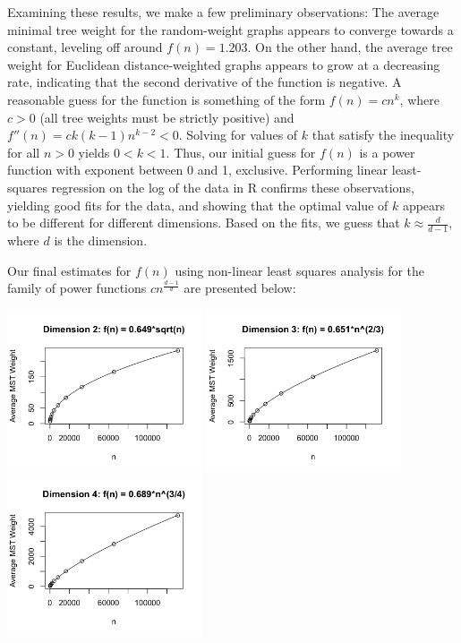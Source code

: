 \documentclass[a4paper]{article}
\begin{document}
Examining these results, we make a few preliminary observations: The average minimal tree weight for the random-weight graphs appears to converge towards a constant, leveling off around $f(n) = 1.203$. On the other hand, the average tree weight for Euclidean distance-weighted graphs appears to grow at a decreasing rate, indicating that the second derivative of the function is negative. A reasonable guess for the function is something of the form $f(n) = cn^k$, where $c>0$ (all tree weights must be strictly positive) and $f''(n) = ck(k-1)n^{k-2} < 0$. Solving for values of $k$ that satisfy the inequality for all $n>0$ yields $0<k<1$. Thus, our initial guess for $f(n)$ is a power function with exponent between 0 and 1, exclusive. Performing linear least-squares regression on the log of the data in R confirms these observations, yielding good fits for the data, and showing that the optimal value of $k$ appears to be different for different dimensions. Based on the fits, we guess that $k\approx \frac{d}{d-1}$, where $d$ is the dimension.

Our final estimates for $f(n)$ using non-linear least squares analysis for the family of power functions $cn^{\frac{d-1}{d}}$ are presented below:

\includegraphics[width=2.27in]{dim2plot}
\includegraphics[width=2.27in]{dim3plot}
\includegraphics[width=2.27in]{dim4plot}
\end{document}
